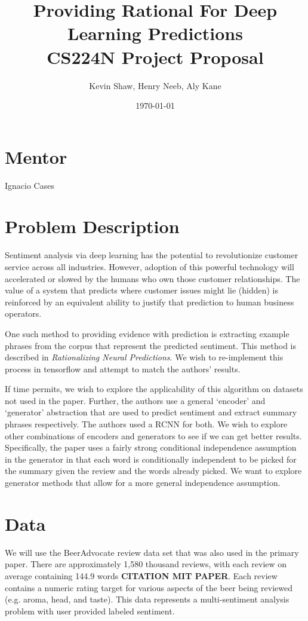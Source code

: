 \documentclass{article}
\title{Providing Rational For Deep Learning Predictions \\
CS224N Project Proposal}
\author{Kevin Shaw, Henry Neeb, Aly Kane}
\date{\today}
\begin{document}
\maketitle

\section*{Mentor}

Ignacio Cases

\section*{Problem Description}

Sentiment analysis via deep learning has the potential to revolutionize customer
service across all industries.  However, adoption of this powerful technology
will accelerated or slowed by the humans who own those customer relationships.
The value of a system that predicts where customer issues might lie (hidden) is
reinforced by an equivalent ability to justify that prediction to human business
operators. 

One such method to providing evidence with prediction is extracting example
phrases from the corpus that represent the predicted sentiment. This method is
described in \textit{Rationalizing Neural Predictions}. We wish to re-implement
this process in tensorflow and attempt to match the authors' results.

If time permits, we wish to explore the applicability of this algorithm on
datasets not used in the paper. Further, the authors use a general `encoder' and
`generator' abstraction that are used to predict sentiment and extract summary
phrases respectively. The authors used a RCNN for both. We wish to explore other
combinations of encoders and generators to see if we can get better results.
Specifically, the paper uses a fairly strong conditional independence assumption
in the generator in that each word is conditionally independent to be picked for
the summary given the review and the words already picked. We want to explore
generator methods that allow for a more general independence assumption.

\section*{Data}

We will use the BeerAdvocate review data set that was also used in the primary
paper. There are approximately 1,580 thousand reviews, with each review on
average containing 144.9 words \textbf{CITATION MIT PAPER}. Each review contains
a numeric rating target for various aspects of the beer being reviewed (e.g.
aroma, head, and taste). This data represents a multi-sentiment analysis problem
with user provided labeled sentiment.
\end{document}
